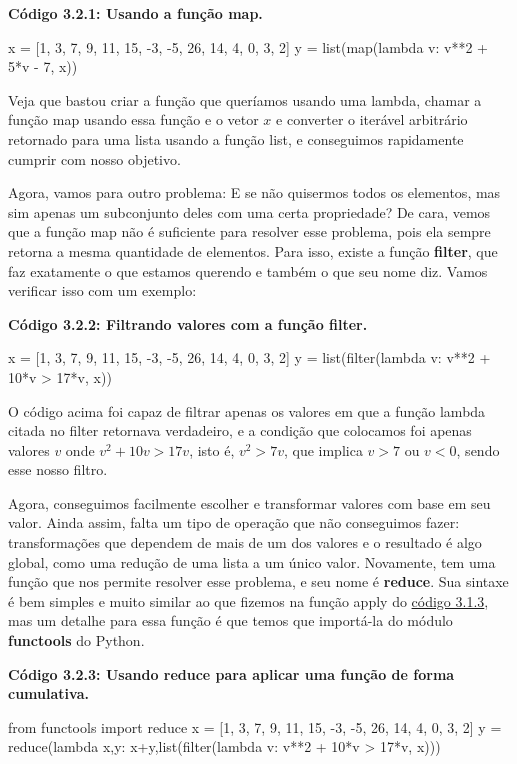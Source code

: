 \documentclass[11pt, a4paper]{article}
\begin{document}
\textbf{Código 3.2.1: Usando a função map.}

\begin{code}
x = [1, 3, 7, 9, 11, 15, -3, -5, 26, 14, 4, 0, 3, 2]
y = list(map(lambda v: v**2 + 5*v - 7, x))
\end{code}

Veja que bastou criar a função que queríamos usando uma lambda, chamar a função map usando essa função e o vetor \(x\) e converter o iterável arbitrário retornado para uma lista usando a função list, e conseguimos rapidamente cumprir com nosso objetivo.

Agora, vamos para outro problema: E se não quisermos todos os elementos, mas sim apenas um subconjunto deles com uma certa propriedade? De cara, vemos que a função map não é suficiente para resolver esse problema, pois ela sempre retorna a mesma quantidade de elementos. Para isso, existe a função \textbf{filter}, que faz exatamente o que estamos querendo e também o que seu nome diz. Vamos verificar isso com um exemplo:

\textbf{Código 3.2.2: Filtrando valores com a função filter.}

\begin{code}
x = [1, 3, 7, 9, 11, 15, -3, -5, 26, 14, 4, 0, 3, 2]
y = list(filter(lambda v: v**2 + 10*v > 17*v, x))
\end{code}

O código acima foi capaz de filtrar apenas os valores em que a função lambda citada no filter retornava verdadeiro, e a condição que colocamos foi apenas valores \(v\) onde \(v^2+10v>17v\), isto é, \(v^2>7v\), que implica \(v>7\) ou \(v<0\), sendo esse nosso filtro.

Agora, conseguimos facilmente escolher e transformar valores com base em seu valor. Ainda assim, falta um tipo de operação que não conseguimos fazer: transformações que dependem de mais de um dos valores e o resultado é algo global, como uma redução de uma lista a um único valor. Novamente, tem uma função que nos permite resolver esse problema, e seu nome é \textbf{reduce}. Sua sintaxe é bem simples e muito similar ao que fizemos na função apply do \href{c3.1.3}{código 3.1.3}, mas um detalhe para essa função é que temos que importá-la do módulo \textbf{functools} do Python.

\textbf{Código 3.2.3: Usando reduce para aplicar uma função de forma cumulativa.}

\begin{code}
from functools import reduce
x = [1, 3, 7, 9, 11, 15, -3, -5, 26, 14, 4, 0, 3, 2]
y = reduce(lambda x,y: x+y,list(filter(lambda v: v**2 + 10*v > 17*v, x)))
\end{code}
\end{document}
